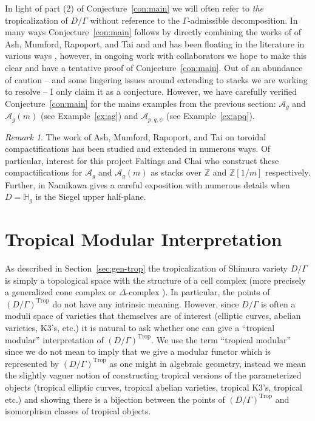 \documentclass[11pt,reqno]{amsart}
\theoremstyle{remark}
\newtheorem{remark}[lemma]{Remark}
\newcommand{\HH}{\mathbb{H}}
\newcommand{\ZZ}{\mathbb{Z}}
\newcommand{\cA}{\mathcal{A}}
\DeclareMathOperator{\Trop}{Trop}
\begin{document}
In light of part (2) of Conjecture~\ref{con:main} we will often refer to \emph{the} tropicalization of $D/\Gamma$ without reference to the $\Gamma$-admissible decomposition. In many ways Conjecture~\ref{con:main} follows by directly combining the works of of Ash, Mumford, Rapoport, and Tai \cite{AMRT} and  \cite{Deligne71,Deligne74,CGP21} and has been floating in the literature in various ways \cite{harris14,harrisZucker}, however, in ongoing work with collaborators we hope to make this clear and have a tentative proof of Conjecture~\ref{con:main}. Out of an abundance of caution -- and some lingering issues around extending \cite{AMRT} to stacks we are working to resolve -- I only claim it as a conjecture. However, we have carefully verified Conjecture~\ref{con:main} for the mains examples from the previous section: $\cA_{g}$ and $\cA_{g}(m)$ (see Example~\ref{ex:ag}) and $\cA_{p,q,\psi}$ (see Example~\ref{ex:apq}).

\begin{remark}
The work of Ash, Mumford, Rapoport, and Tai  on toroidal compactifications has been studied and extended in numerous ways. Of particular, interest for this project Faltings and Chai \cite{faltingsChai} who construct these compactifications for $\cA_{g}$ and $\cA_{g}(m)$ as stacks over $\ZZ$ and $\ZZ[1/m]$ respectively. Further, in \cite{namikawa80} Namikawa gives a careful exposition with numerous details when $D=\HH_{g}$ is the Siegel upper half-plane. 
\end{remark}


\section{Tropical Modular Interpretation}\label{sec:trop-mod}

As described in Section~\ref{sec:gen-trop} the tropicalization of Shimura variety $D/\Gamma$ is simply a topological space with the structure of a cell complex (more precisely a generalized cone complex or $\Delta$-complex \cite{abramovichCaporasoPayne15, CGP21}). In particular, the points of $(D/\Gamma)^{\Trop}$ do not have any intrinsic meaning. However, since $D/\Gamma$ is often a moduli space of varieties that themselves are of interest (elliptic curves, abelian varieties, K3's, etc.) it is natural to ask whether one can give a ``tropical modular'' interpretation of $(D/\Gamma)^{\Trop}$.  We use the term ``tropical modular'' since we do not mean to imply that we give a modular functor which is represented by $(D/\Gamma)^{\Trop}$ as one might in algebraic geometry, instead we mean the slightly vaguer notion of constructing tropical versions of the parameterized objects (tropical elliptic curves, tropical abelian varieties, tropical K3's, tropical etc.) and showing there is a bijection between the points of $(D/\Gamma)^{\Trop}$ and isomorphism classes of tropical objects.
\end{document}

